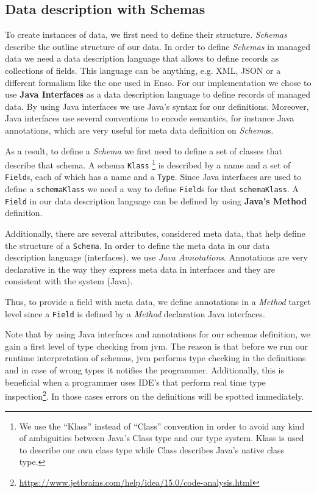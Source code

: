 \subsection{Data description with Schemas}\label{Schema Definition}
To create instances of data, we first need to define their structure.
\textit{Schemas} describe the outline structure of our data.
In order to define \textit{Schemas} in managed data we need a data description language that allows to define records as collections of fields.
This language can be anything, e.g. XML, JSON or a different formalism like the one used in Enso.
For our implementation we chose to use \textbf{Java Interfaces} as a data description language to define records of managed data.
By using Java interfaces we use Java's syntax for our definitions.
Moreover, Java interfaces use several conventions to encode semantics, for instance Java annotations, which are very useful for meta data definition on \textit{Schema}s.

As a result, to define a \textit{Schema} we first need to define a set of classes that describe that schema.
A schema \texttt{Klass} \footnote{
	We use the ``Klass'' instead of ``Class'' convention in order to avoid any kind of ambiguities between Java's Class type and our type system. Klass is used to describe our own class type while Class describes Java's native class type.} 
is described by a name and a set of \texttt{Field}s, each of which has a name and a \texttt{Type}.
Since Java interfaces are used to define a \texttt{schemaKlass} we need a way to define \texttt{Field}s for that \texttt{schemaKlass}.
A \texttt{Field} in our data description language can be defined by using \textbf{Java's Method} definition.

Additionally, there are several attributes, considered meta data, that help define the structure of a \texttt{Schema}.
In order to define the meta data in our data description language (interfaces), we use \textit{Java Annotations}.
Annotations are very declarative in the way they express meta data in interfaces and they are consistent with the system (Java).

Thus, to provide a field with meta data, we define annotations in a \textit{Method} target level since a \texttt{Field} is defined by a \textit{Method} declaration Java interfaces.

Note that by using Java interfaces and annotations for our schemas definition, we gain a first level of type checking from \ac{jvm}. 
The reason is that before we run our runtime interpretation of schemas, \ac{jvm} performs type checking in the definitions and in case of wrong types it notifies the programmer.
Additionally, this is beneficial when a programmer uses IDE's that perform real time type inspection\footnote{\url{https://www.jetbrains.com/help/idea/15.0/code-analysis.html}}. 
In those cases errors on the definitions will be spotted immediately. 

